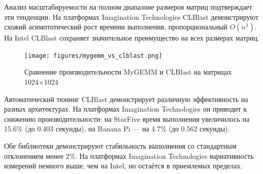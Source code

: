 Анализ масштабируемости на полном диапазоне размеров матриц подтверждает эти тенденции. На платформах Imagination Technologies CLBlast демонстрируют схожий асимптотический рост времени выполнения, пропорциональный $O(n^3)$. На Intel CLBlast сохраняет значительное преимущество на всех размерах матриц.

\begin{figure}[h!]
\centering
\texttt{[image: figures/mygemm\_vs\_clblast.png]}
\caption{Сравнение производительности MyGEMM и CLBlast на матрицах 1024×1024}
\label{fig:clblast_vs_mygemm}
\end{figure}

Автоматический тюнинг CLBlast демонстрирует различную эффективность на разных архитектурах. На платформах Imagination Technologies он приводит к снижению производительности: на StarFive время выполнения увеличилось на 15.6\% (до 0.403 секунды), на Banana Pi — на 4.7\% (до 0.562 секунды).

Обе библиотеки демонстрируют стабильность выполнения со стандартным отклонением менее 2\%. На платформах Imagination Technologies вариативность измерений немного выше, чем на Intel, но остаётся в приемлемых пределах.